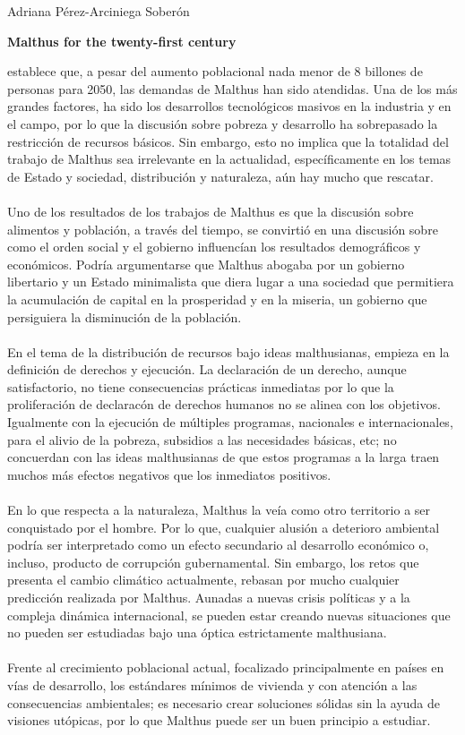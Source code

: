 \documentclass[11pt,spanish,letterpaper]{article}
\theoremstyle{plain}
\begin{document}
\begin{flushleft}
Adriana P\'erez-Arciniega Sober\'on
\end{flushleft}
\begin{center}
\textbf{Malthus for the twenty-first century}
\end{center}
\cite{mcnicoll1998malthus} establece que, a pesar del aumento poblacional nada menor de 8 billones de personas para 2050, las demandas de Malthus han sido atendidas. Una de los m\'as grandes factores, ha sido los desarrollos tecnol\'ogicos masivos en la industria y en el campo, por lo que la discusi\'on sobre pobreza y desarrollo ha sobrepasado la restricci\'on de recursos b\'asicos. Sin embargo, esto no implica que la totalidad del trabajo de Malthus sea irrelevante en la actualidad, espec\'ificamente en los temas de Estado y sociedad, distribuci\'on y naturaleza, a\'un hay mucho que rescatar.\\
\\
Uno de los resultados de los trabajos de Malthus es que la discusi\'on sobre alimentos y poblaci\'on, a trav\'es del tiempo, se convirti\'o en una discusi\'on sobre como el orden social y el gobierno influenc\'ian los resultados demogr\'aficos y econ\'omicos. Podr\'ia argumentarse que Malthus abogaba por un gobierno libertario y un Estado minimalista que diera lugar a una sociedad que permitiera la acumulaci\'on de capital en la prosperidad y en la miseria, un gobierno que persiguiera la disminuci\'on de la poblaci\'on.\\
\\
En el tema de la distribuci\'on de recursos bajo ideas malthusianas, empieza en la definici\'on de derechos y ejecuci\'on. La declaraci\'on de un derecho, aunque satisfactorio, no tiene consecuencias pr\'acticas inmediatas por lo que la proliferaci\'on de declarac\'on de derechos humanos no se alinea con los objetivos. Igualmente con la ejecuci\'on de m\'ultiples programas, nacionales e internacionales, para el alivio de la pobreza, subsidios a las necesidades b\'asicas, etc; no concuerdan con las ideas malthusianas de que estos programas a la larga traen muchos m\'as efectos negativos que los inmediatos positivos.\\
\\
En lo que respecta a la naturaleza, Malthus la ve\'ia como otro territorio a ser conquistado por el hombre. Por lo que, cualquier alusi\'on a deterioro ambiental podr\'ia ser interpretado como un efecto secundario al desarrollo econ\'omico o, incluso, producto de corrupci\'on gubernamental. Sin embargo, los retos que presenta el cambio clim\'atico actualmente, rebasan por mucho cualquier predicci\'on realizada por Malthus. Aunadas a nuevas crisis pol\'iticas y a la compleja din\'amica internacional, se pueden estar creando nuevas situaciones que no pueden ser estudiadas bajo una \'optica estrictamente malthusiana.\\
\\
Frente al crecimiento poblacional actual, focalizado principalmente en pa\'ises en v\'ias de desarrollo, los est\'andares m\'inimos de vivienda y con atenci\'on a las consecuencias ambientales; es necesario crear soluciones s\'olidas sin la ayuda de visiones ut\'opicas, por lo que Malthus puede ser un buen principio a estudiar.


\end{document}
